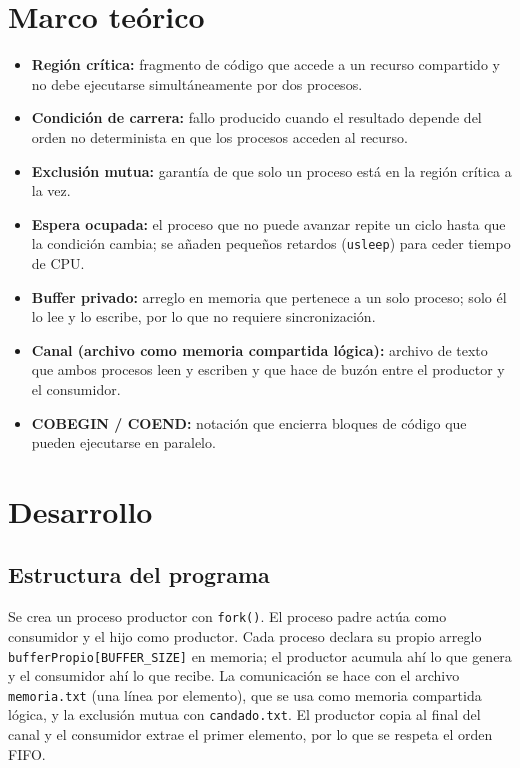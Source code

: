 \documentclass[12pt,letterpaper]{article}
\begin{document}
\section{Marco te\'orico}
\begin{itemize}[leftmargin=1.4cm]
    \item \textbf{Regi\'on cr\'itica:} fragmento de c\'odigo que accede a un
    recurso compartido y no debe ejecutarse simult\'aneamente por dos procesos.
    \item \textbf{Condici\'on de carrera:} fallo producido cuando el resultado
    depende del orden no determinista en que los procesos acceden al recurso.
    \item \textbf{Exclusi\'on mutua:} garant\'ia de que solo un proceso est\'a en
    la regi\'on cr\'itica a la vez.
    \item \textbf{Espera ocupada:} el proceso que no puede avanzar repite un
    ciclo hasta que la condici\'on cambia; se a\~naden peque\~nos retardos
    (\texttt{usleep}) para ceder tiempo de CPU.
    \item \textbf{Buffer privado:} arreglo en memoria que pertenece a un solo
    proceso; solo \'el lo lee y lo escribe, por lo que no requiere
    sincronizaci\'on.
    \item \textbf{Canal (archivo como memoria compartida l\'ogica):} archivo de
    texto que ambos procesos leen y escriben y que hace de buz\'on entre el
    productor y el consumidor.
    \item \textbf{COBEGIN / COEND:} notaci\'on que encierra bloques de c\'odigo
    que pueden ejecutarse en paralelo.
\end{itemize}

\section{Desarrollo}
\subsection{Estructura del programa}
Se crea un proceso productor con \texttt{fork()}. El proceso padre act\'ua como
consumidor y el hijo como productor. Cada proceso declara su propio arreglo
\texttt{bufferPropio[BUFFER\_SIZE]} en memoria; el productor acumula ah\'i lo
que genera y el consumidor ah\'i lo que recibe. La comunicaci\'on se hace con
el archivo \texttt{memoria.txt} (una l\'inea por elemento), que se usa como
memoria compartida l\'ogica, y la exclusi\'on mutua con \texttt{candado.txt}.
El productor copia al final del canal y el consumidor extrae el primer
elemento, por lo que se respeta el orden FIFO.
\end{document}
